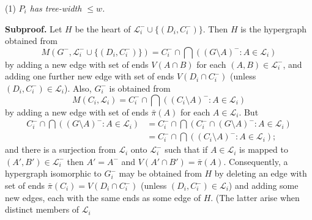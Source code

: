 \hspace*{12pt}(1) \textit{$P_i$ has tree-width $\le w$.}

\textbf{Subproof.} Let $H$ be the heart of $\mathscr{L}_i^- \cup \{(D_i, C_i^-)\}$. Then $H$ is the hypergraph obtained from
\begin{equation*}
M(G^-, \mathscr{L}_i^- \cup \{(D_i, C_i^-)\}) = C_i^- \cap \bigcap ((G \setminus A)^- \colon A \in \mathscr{L}_i)
\end{equation*}
by adding a new edge with set of ends $V(A \cap B)$ for each $(A, B) \in \mathscr{L}_i^-$, and adding one further new edge with set of ends $V(D_i \cap C_i^-)$ (unless $(D_i, C_i^-) \in \mathscr{L}_i$). Also, $G_i^-$ is obtained from
\begin{equation*}
M(C_i, \mathscr{L}_i) = C_i^- \cap \bigcap ((C_i \setminus A)^- \colon A \in \mathscr{L}_i)
\end{equation*}
by adding a new edge with set of ends $\bar{\pi}(A)$ for each $A \in \mathscr{L}_i$. But
\begin{align*}
C_i^- \cap \bigcap ((G \setminus A)^- \colon A \in \mathscr{L}_i) &= C_i^- \cap \bigcap (C_i^- \cap (G \setminus A)^- \colon A \in \mathscr{L}_i) \\
&= C_i^- \cap \bigcap ((C_i \setminus A)^- \colon A \in \mathscr{L}_i);
\end{align*}
and there is a surjection from $\mathscr{L}_i$ onto $\mathscr{L}_i^-$ such that if $A \in \mathscr{L}_i$ is mapped to $(A', B') \in \mathscr{L}_i^-$ then $A' = A^-$ and $V(A' \cap B') = \bar{\pi}(A)$. Consequently, a hypergraph isomorphic to $G_i^-$ may be obtained from $H$ by deleting an edge with set of ends $\bar{\pi}(C_i) = V(D_i \cap C_i^-)$ (unless $(D_i, C_i^-) \in \mathscr{L}_i$) and adding some new edges, each with the same ends as some edge of $H$. (The latter arise when distinct members of $\mathscr{L}_i$
